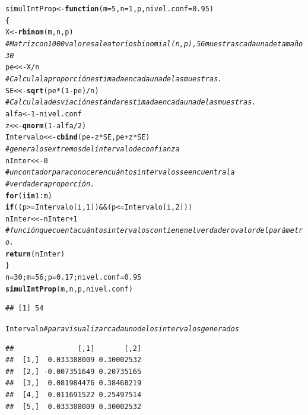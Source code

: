 \documentclass[12pt,letterpaper]{article}\usepackage[]{graphicx}\usepackage[]{color}
\makeatletter
\newcommand{\hlnum}[1]{\textcolor[rgb]{0.686,0.059,0.569}{#1}}%
\newcommand{\hlcom}[1]{\textcolor[rgb]{0.678,0.584,0.686}{\textit{#1}}}%
\newcommand{\hlopt}[1]{\textcolor[rgb]{0,0,0}{#1}}%
\newcommand{\hlstd}[1]{\textcolor[rgb]{0.345,0.345,0.345}{#1}}%
\newcommand{\hlkwa}[1]{\textcolor[rgb]{0.161,0.373,0.58}{\textbf{#1}}}%
\newcommand{\hlkwb}[1]{\textcolor[rgb]{0.69,0.353,0.396}{#1}}%
\newcommand{\hlkwc}[1]{\textcolor[rgb]{0.333,0.667,0.333}{#1}}%
\newcommand{\hlkwd}[1]{\textcolor[rgb]{0.737,0.353,0.396}{\textbf{#1}}}%
\newenvironment{kframe}{%
 \def\at@end@of@kframe{}%
 \ifinner\ifhmode%
  \def\at@end@of@kframe{\end{minipage}}%
  \begin{minipage}{\columnwidth}%
 \fi\fi%
 \def\FrameCommand##1{\hskip\@totalleftmargin \hskip-\fboxsep
 \colorbox{shadecolor}{##1}\hskip-\fboxsep
     \hskip-\linewidth \hskip-\@totalleftmargin \hskip\columnwidth}%
 \MakeFramed {\advance\hsize-\width
   \@totalleftmargin\z@ \linewidth\hsize
   \@setminipage}}%
 {\par\unskip\endMakeFramed%
 \at@end@of@kframe}
\newenvironment{knitrout}{}{} %
\makeatother
\begin{document}
\begin{knitrout}
\color{fgcolor}\begin{kframe}
\begin{alltt}
\hlstd{simulIntProp} \hlkwb{<-} \hlkwa{function}\hlstd{(}\hlkwc{m}\hlstd{=}\hlnum{5}\hlstd{,} \hlkwc{n}\hlstd{=}\hlnum{1}\hlstd{,} \hlkwc{p}\hlstd{,} \hlkwc{nivel.conf}\hlstd{=}\hlnum{0.95}\hlstd{)}
\hlstd{\{}
\hlstd{X} \hlkwb{<-} \hlkwd{rbinom}\hlstd{(m, n, p)}
\hlcom{# Matriz con 1000 valores aleatorios binomial(n,p), 56 muestras cada una de tamaño 30 }
\hlstd{pe} \hlkwb{<<-} \hlstd{X}\hlopt{/}\hlstd{n}
 \hlcom{# Calcula la proporción estimada en cada una de las muestras. }
\hlstd{SE} \hlkwb{<<-} \hlkwd{sqrt}\hlstd{(pe}\hlopt{*}\hlstd{(}\hlnum{1}\hlopt{-}\hlstd{pe)}\hlopt{/}\hlstd{n)}
\hlcom{# Calcula la desviación estándarestimada en cada una de las muestras. }
\hlstd{alfa} \hlkwb{<-} \hlnum{1}\hlopt{-}\hlstd{nivel.conf}
\hlstd{z} \hlkwb{<<-} \hlkwd{qnorm}\hlstd{(}\hlnum{1}\hlopt{-}\hlstd{alfa}\hlopt{/}\hlnum{2}\hlstd{)}
\hlstd{Intervalo} \hlkwb{<<-} \hlkwd{cbind}\hlstd{(pe} \hlopt{-} \hlstd{z}\hlopt{*}\hlstd{SE, pe} \hlopt{+} \hlstd{z}\hlopt{*}\hlstd{SE)}
\hlcom{# genera los extremos del intervalo de confianza }
\hlstd{nInter} \hlkwb{<<-} \hlnum{0}
\hlcom{# un contador para conocer en cuántos intervalos se encuentra la }
\hlcom{#verdadera proporción. }
\hlkwa{for}\hlstd{(i} \hlkwa{in} \hlnum{1}\hlopt{:}\hlstd{m)}
\hlkwa{if} \hlstd{((p} \hlopt{>=} \hlstd{Intervalo[i,} \hlnum{1}\hlstd{])} \hlopt{&&} \hlstd{(p} \hlopt{<=} \hlstd{Intervalo[i,} \hlnum{2}\hlstd{]))}
\hlstd{nInter} \hlkwb{<<-} \hlstd{nInter} \hlopt{+} \hlnum{1}
\hlcom{# función que cuenta cuántos intervalos contienen el verdadero valor del parámetro. }
\hlkwd{return}\hlstd{(nInter)}
\hlstd{\}}
\hlstd{n}\hlkwb{=}\hlnum{30}\hlstd{; m}\hlkwb{=} \hlnum{56}\hlstd{; p}\hlkwb{=}\hlnum{0.17}\hlstd{; nivel.conf}\hlkwb{=}\hlnum{0.95}
\hlkwd{simulIntProp}\hlstd{(m, n, p, nivel.conf)}
\end{alltt}
\begin{verbatim}
## [1] 54
\end{verbatim}
\begin{alltt}
\hlstd{Intervalo} \hlcom{# para visualizar cada uno de los intervalos generados }
\end{alltt}
\begin{verbatim}
##               [,1]       [,2]
##  [1,]  0.033308009 0.30002532
##  [2,] -0.007351649 0.20735165
##  [3,]  0.081984476 0.38468219
##  [4,]  0.011691522 0.25497514
##  [5,]  0.033308009 0.30002532

\end{verbatim}
\end{kframe}
\end{knitrout}
\end{document}
